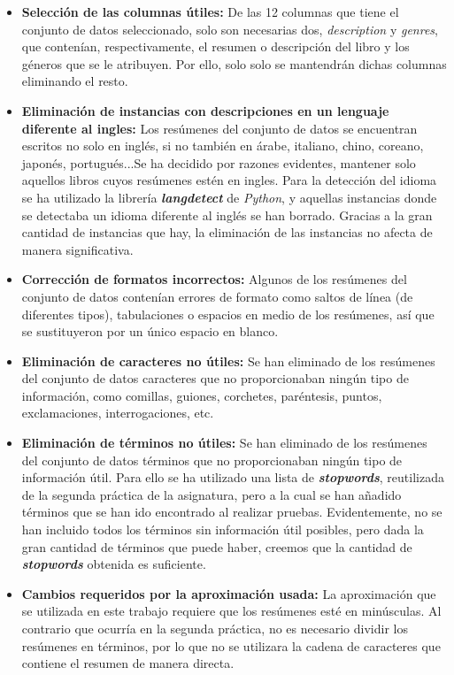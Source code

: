 \documentclass[12pt,a4paper, xcolor=table]{article}
\begin{document}
        \begin{itemize}
            \item \textbf{Selección de las columnas útiles:} De las 12 columnas que tiene el conjunto de datos seleccionado, solo son necesarias dos, \textit{description} y \textit{genres}, que contenían, respectivamente, el resumen o descripción del libro y los géneros que se le atribuyen. Por ello, solo solo se mantendrán dichas columnas eliminando el resto.
            \item \textbf{Eliminación de instancias con descripciones en un lenguaje diferente al ingles:} Los resúmenes del conjunto de datos se encuentran escritos no solo en inglés, si no también en árabe, italiano, chino, coreano, japonés, portugués...Se ha decidido por razones evidentes, mantener solo aquellos libros cuyos resúmenes estén en ingles. Para la detección del idioma se ha utilizado la librería \textit{\textbf{langdetect}}\cite{langdetect} de \textit{Python}, y aquellas instancias donde se detectaba un idioma diferente al inglés se han borrado. Gracias a la gran cantidad de instancias que hay, la eliminación de las instancias no afecta de manera significativa.
            \item \textbf{Corrección de formatos incorrectos:} Algunos de los resúmenes del conjunto de datos contenían errores de formato como saltos de línea (de diferentes tipos), tabulaciones o espacios en medio de los resúmenes, así que se sustituyeron por un único espacio en blanco.
            \item \textbf{Eliminación de caracteres no útiles:} Se han eliminado de los resúmenes del conjunto de datos caracteres que no proporcionaban ningún tipo de información, como comillas, guiones, corchetes, paréntesis, puntos, exclamaciones, interrogaciones, etc.
            \item \textbf{Eliminación de términos no útiles:} Se han eliminado de los resúmenes del conjunto de datos términos que no proporcionaban ningún tipo de información útil. Para ello se ha utilizado una lista de \textit{\textbf{stopwords}}, reutilizada de la segunda práctica de la asignatura, pero a la cual se han añadido términos que se han ido encontrado al realizar pruebas. Evidentemente, no se han incluido todos los términos sin información útil posibles, pero dada la gran cantidad de términos que puede haber, creemos que la cantidad de \textit{\textbf{stopwords}} obtenida es suficiente.
            \item \textbf{Cambios requeridos por la aproximación usada:} La aproximación que se utilizada en este trabajo requiere que los resúmenes esté en minúsculas. Al contrario que ocurría en la segunda práctica, no es necesario dividir los resúmenes en términos, por lo que no se utilizara la cadena de caracteres que contiene el resumen de manera directa.

\end{itemize}
\end{document}
